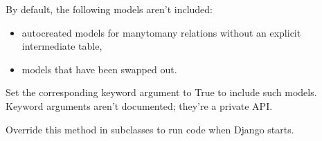 \documentclass[letterpaper,10pt,english]{sphinxmanual}
\begin{document}
\begin{fulllineitems}
\begin{fulllineitems}
\sphinxAtStartPar
By default, the following models aren’t included:
\begin{itemize}
\item {} 
\sphinxAtStartPar
auto\sphinxhyphen{}created models for many\sphinxhyphen{}to\sphinxhyphen{}many relations without
an explicit intermediate table,

\item {} 
\sphinxAtStartPar
models that have been swapped out.

\end{itemize}

\sphinxAtStartPar
Set the corresponding keyword argument to True to include such models.
Keyword arguments aren’t documented; they’re a private API.

\end{fulllineitems}


\begin{fulllineitems}
\label{\detokenize{open_ai:open_ai.apps.OpenAiConfig.import_models}}
\pysigstartsignatures
{}
\pysigstopsignatures
\end{fulllineitems}


\begin{fulllineitems}
\label{\detokenize{open_ai:open_ai.apps.OpenAiConfig.name}}
\pysigstartsignatures
{}
\pysigstopsignatures
\end{fulllineitems}


\begin{fulllineitems}
\label{\detokenize{open_ai:open_ai.apps.OpenAiConfig.ready}}
\pysigstartsignatures
{}
\pysigstopsignatures
\sphinxAtStartPar
Override this method in subclasses to run code when Django starts.

\end{fulllineitems}


\end{fulllineitems}
\end{document}
